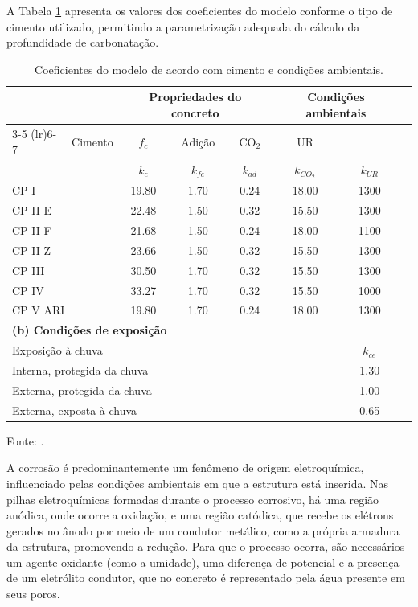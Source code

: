 A Tabela \ref{tab:coef_model} apresenta os valores dos coeficientes do modelo conforme o tipo de cimento utilizado, permitindo a parametrização adequada do cálculo da profundidade de carbonatação.

\begin{table}[H]
\centering
\caption{\label{tab:coef_model}Coeficientes do modelo de acordo com cimento e condições ambientais.}
\renewcommand{\arraystretch}{1.2} %
\begin{tabular}{llcccccc}
\toprule
\multicolumn{2}{c}{} & \multicolumn{3}{c}{\textbf{Propriedades do concreto}} & \multicolumn{2}{c}{\textbf{Condições ambientais}} \\
\cmidrule(lr){3-5} \cmidrule(lr){6-7}
\multicolumn{2}{c}{\textbf{(a) Tipo de cimento}} & Cimento & $f_c$ & Adição & CO$_2$ & UR \\
\multicolumn{2}{c}{} & $k_c$ & $k_{fc}$ & $k_{ad}$ & $k_{CO_2}$ & $k_{UR}$ \\
\midrule
\multicolumn{2}{l}{CP I}     & 19.80 & 1.70 & 0.24 & 18.00 & 1300 \\
\multicolumn{2}{l}{CP II E}  & 22.48 & 1.50 & 0.32 & 15.50 & 1300 \\
\multicolumn{2}{l}{CP II F}  & 21.68 & 1.50 & 0.24 & 18.00 & 1100 \\
\multicolumn{2}{l}{CP II Z}  & 23.66 & 1.50 & 0.32 & 15.50 & 1300 \\
\multicolumn{2}{l}{CP III}   & 30.50 & 1.70 & 0.32 & 15.50 & 1300 \\
\multicolumn{2}{l}{CP IV}    & 33.27 & 1.70 & 0.32 & 15.50 & 1000 \\
\multicolumn{2}{l}{CP V ARI} & 19.80 & 1.70 & 0.24 & 18.00 & 1300 \\
\midrule
\multicolumn{7}{l}{\textbf{(b) Condições de exposição}} \\
\midrule
\multicolumn{6}{l}{Exposição à chuva} & $k_{ce}$ \\
\multicolumn{6}{l}{Interna, protegida da chuva} & 1.30 \\
\multicolumn{6}{l}{Externa, protegida da chuva} & 1.00 \\
\multicolumn{6}{l}{Externa, exposta à chuva} & 0.65 \\
\bottomrule
\end{tabular}

\vspace{0.3em}
\raggedright \footnotesize Fonte: \cite{possan2010}.
\centering
\end{table}

A corrosão é predominantemente um fenômeno de origem eletroquímica, influenciado pelas condições ambientais em que a estrutura está inserida. Nas pilhas eletroquímicas formadas durante o processo corrosivo, há uma região anódica, onde ocorre a oxidação, e uma região catódica, que recebe os elétrons gerados no ânodo por meio de um condutor metálico, como a própria armadura da estrutura, promovendo a redução. Para que o processo ocorra, são necessários um agente oxidante (como a umidade), uma diferença de potencial e a presença de um eletrólito condutor, que no concreto é representado pela água presente em seus poros. 

